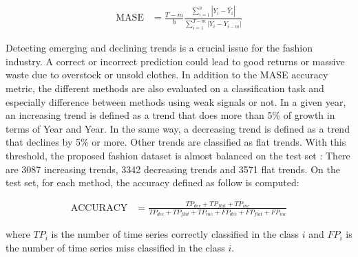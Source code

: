 \documentclass{article} %
\newcommand{\lag}{h}
\begin{document}
\begin{align*}
\mathrm{MASE} &= \frac{T-m}{h}\frac{\sum_{i=1}^h |Y_i - \hat{Y}_i| }{\sum_{i=1}^{T-m} |Y_i - Y_{i-m}|}
\end{align*}


%

Detecting emerging and declining trends is a crucial issue for the fashion industry. A correct or incorrect prediction could lead to good returns or massive waste due to overstock or unsold clothes. In addition to the MASE accuracy metric, the different methods are also evaluated on a classification task and especially difference between methods using weak signals or not. In a given year, an increasing trend is defined as a trend that does more than 5\% of growth in terms of Year and Year. In the same way, a decreasing trend is defined as a trend that declines by 5\% or more. Other trends are classified as flat trends. With this threshold, the proposed fashion dataset is almost balanced on the test set : There are 3087 increasing trends, 3342 decreasing trends and 3571 flat trends. On the test set, for each method, the accuracy defined as follow is computed:

\begin{align*}
\mathrm{ACCURACY} &= \frac{TP_{dec} + TP_{flat} + TP_{inc}}{TP_{dec} + TP_{flat} + TP_{inc} + FP_{dec} + FP_{flat} + FP_{inc}}
\end{align*}

where $TP_i$ is the number of time series correctly classified in the class $i$ and $FP_i$ is the number of time series miss classified in the class $i$.
\end{document}
